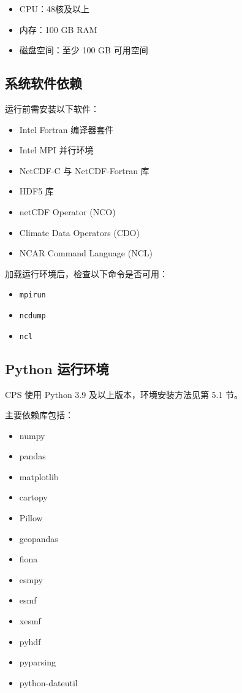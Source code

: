 \documentclass[UTF8,a4paper,11pt,fontset=none]{ctexart}
\begin{document}
\begin{itemize}[leftmargin=4em]
    \item CPU：48核及以上
    \item 内存：100 GB RAM
    \item 磁盘空间：至少 100 GB 可用空间
\end{itemize}

\subsection{系统软件依赖}

运行前需安装以下软件：

\begin{itemize}[leftmargin=4em]
    \item Intel Fortran 编译器套件
    \item Intel MPI 并行环境
    \item NetCDF-C 与 NetCDF-Fortran 库
    \item HDF5 库
    \item netCDF Operator (NCO)
    \item Climate Data Operators (CDO)
    \item NCAR Command Language (NCL)
\end{itemize}

\begin{CPSNote}[Tips]
    加载运行环境后，检查以下命令是否可用：
    \begin{itemize}
        \item \texttt{mpirun}
        \item \texttt{ncdump}
        \item \texttt{ncl}
    \end{itemize}
\end{CPSNote}


\subsection{Python 运行环境}

CPS 使用 Python 3.9 及以上版本，环境安装方法见第 5.1 节。

主要依赖库包括：

\begin{itemize}[leftmargin=4em]
        \item numpy
        \item pandas
        \item matplotlib
        \item cartopy
        \item Pillow
        \item geopandas
        \item fiona
        \item esmpy
        \item esmf
        \item xesmf
        \item pyhdf
        \item pyparsing
        \item python-dateutil
\end{itemize}
\end{document}
